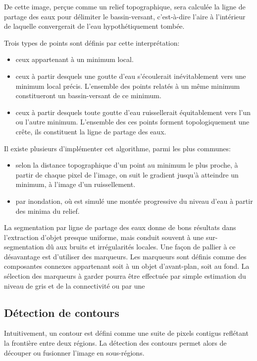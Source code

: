 \documentclass[a4paper,12pt]{report}
\begin{document}
De cette image, perçue comme un relief topographique, sera calculée la ligne de partage des eaux pour délimiter le bassin-versant, c'est-à-dire l'aire à l'intérieur de laquelle convergerait de l'eau hypothétiquement tombée. 

Trois types de points sont définis par cette interprétation:
\begin{itemize}
\item ceux appartenant à un minimum local.
\item ceux à partir desquels une goutte d'eau s'écoulerait inévitablement vers une minimum local précis. L'ensemble des points relatés à un même minimum constitueront un bassin-versant de ce minimum.
\item ceux à partir desquels toute goutte d'eau ruissellerait équitablement vers l'un ou l'autre minimum. L'ensemble des ces points forment topologiquement une crête, ils constituent la ligne de partage des eaux.\\
\end{itemize} 
 

Il existe plusieurs d'implémenter cet algorithme, parmi les plus communes: 
\begin{itemize}
\item selon la distance topographique d'un point au minimum le plus proche, à partir de chaque pixel de l'image, on suit le gradient jusqu'à atteindre un minimum, à l'image d'un ruissellement.
\item par inondation, où est simulé une montée progressive du niveau d'eau à partir des minima du relief.\\
\end{itemize}

La segmentation par ligne de partage des eaux donne de bons résultats dans l'extraction d'objet presque uniforme, mais conduit souvent à une sur-segmentation dû aux bruits et irrégularités locales. Une façon de pallier à ce désavantage est d'utiliser des marqueurs. Les marqueurs sont définis comme des composantes connexes appartenant soit à un objet d'avant-plan, soit au fond. La sélection des marqueurs à garder pourra être effectuée par simple estimation du niveau de gris et de la connectivité ou par une   


\subsection{Détection de contours}
Intuitivement, un contour est défini comme une suite de pixels contigus reflétant la frontière entre deux régions. 
La détection des contours permet alors de découper ou fusionner l'image en sous-régions.
\end{document}
